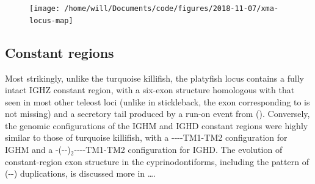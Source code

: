 	\begin{figure}
	\centering
	\texttt{[image: /home/will/Documents/code/figures/2018-11-07/xma-locus-map]}
	\caption[The immunoglobulin heavy chain (\textit{IGH}) locus in \textit{}]{\textbf{The immunoglobulin heavy chain (\textit{IGH}) locus in \textit{Xiphophorus maculatus}:} (A) Position of the \textit{IGH} locus on chromosome (group) 16 of the \Xma genome. (B) Arrangement of \vh, \dh, \jh and constant-region gene segments on the \Xma \textit{IgH} locus. (C) Detailed map of the \textit{IGHZ} and \textit{IGHM/D} constant regions, indicating the position and identity of the constant-region exons and the exon composition of expressed \textit{IgH} isoforms in \Xma.}
	\begin{subfigure}{0em}
        \label{fig:xma-locus-map-a}
    \end{subfigure}
    \begin{subfigure}{0em}
        \label{fig:xma-locus-map-b}
    \end{subfigure}
    \begin{subfigure}{0em}
        \label{fig:xma-locus-map-c}
    \end{subfigure}
	\label{fig:xma-locus-map}
\end{figure}

	
	\subsection{Constant regions}
	
	Most strikingly, unlike the turquoise killifish, the platyfish locus contains a fully intact IGHZ constant region, with a six-exon structure homologous with that seen in most other teleost loci (unlike in stickleback, the exon corresponding to  is not missing) and a secretory tail produced by a run-on event from  (). Conversely, the genomic configurations of the IGHM and IGHD constant regions were highly similar to those of turquoise killifish, with a {----TM1-TM2} configuration for IGHM and a {-(--)$_2$----TM1-TM2} configuration for IGHD. The evolution of constant-region exon structure in the cyprinodontiforms, including the pattern of (--) duplications, is discussed more in \dots .
	
